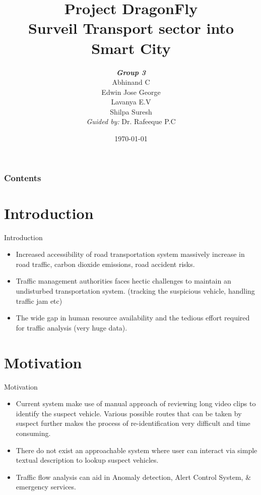 \documentclass{beamer}
\title[DragonFly]{Project DragonFly \\ Surveil Transport sector into Smart City}
\author[Group 3]{
	{\small \textbf{\textit{Group 3}}} \\
	Abhinand C \\
	Edwin Jose George \\
	Lavanya E.V \\
	Shilpa Suresh \\
	\medskip
	{\small \textit{Guided by:}} Dr. Rafeeque P.C \\
}
\institute[GCEK]{Department of Computer Science and Engineering \\
	Government College of Engineering Kannur
}
\date{\today}
\begin{document}
\begin{frame}
\titlepage
\end{frame}

\begin{frame}
\frametitle{Contents}
\tableofcontents
\end{frame}


\section{Introduction}
\begin{frame}{Introduction}
    
    \begin{itemize}
    	\item Increased accessibility of road transportation system massively increase in road traffic, carbon dioxide emissions, road accident risks.
    	
    	\item Traffic management authorities faces hectic challenges to maintain an undisturbed transportation
system. (tracking the suspicious vehicle, handling traffic jam etc)
    	
    	\item The wide gap in human resource availability and the tedious effort required for traffic analysis (very huge data).
    \end{itemize}
\end{frame}



\section{Motivation}
\begin{frame}{Motivation}
	\begin{itemize}
		\item Current system make use of manual approach of reviewing long video clips to identify the suspect vehicle. Various possible routes that can be taken by suspect further makes the process of re-identification very difficult and time consuming.
		
		\item There do not exist an approachable system where user can interact via simple textual description to lookup suspect vehicles.
		
		\item Traffic flow analysis can aid in Anomaly detection, Alert Control System, \& emergency services.		
	\end{itemize}
	
\end{frame}
\end{document}
